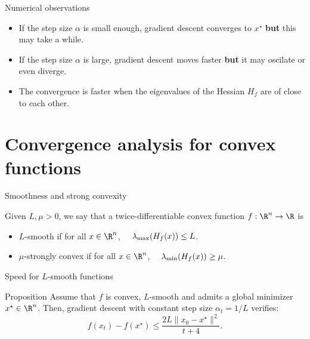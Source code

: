 \documentclass{beamer}
\begin{document}
\begin{frame}[t]{Numerical observations}
	\grid

	\begin{itemize}
		\item If the step size $\alpha$ is small enough, gradient descent converges to $x^{\star}$ \textbf{but} this may take a while.
			\vspace{0.4cm}
		\item If the step size $\alpha$ is large, gradient descent moves faster \textbf{but} it may oscilate or even diverge.
			\vspace{0.4cm}
		\item The convergence is faster when the eigenvalues of the Hessian $H_f$ are of close to each other.
	\end{itemize}

\end{frame}

\section{Convergence analysis for convex functions}

\begin{frame}[t]{Smoothness and strong convexity}
	\grid

	\vspace{-0.4cm}
	\begin{definition}
		Given $L,\mu > 0$, we say that a twice-differentiable convex function $f:\R^n \to \R$ is
		\begin{itemize}
			\item $L$-smooth if for all $x \in \R^n$, \ \ $\lambda_{\rm max}(H_f(x))\leq L$.
			\item $\mu$-strongly convex if for all $x \in \R^n$, \ \ $\lambda_{\rm min}(H_f(x))\geq \mu$.
		\end{itemize}
	\end{definition}
\end{frame}

\begin{frame}[t]{Speed for $L$-smooth functions}
	\grid

	\vspace{-0.4cm}
	\begin{block}{Proposition}
		Assume that $f$ is convex, $L$-smooth and admits a global minimizer $x^{\star} \in \R^n$.
		Then, gradient descent with constant step size $\alpha_t = 1/L$ verifies:
		$$
		f(x_t) - f(x^{\star}) \leq \frac{2 L \|x_0 - x^{\star}\|^2}{t+4}.
		$$
	\end{block}
\end{frame}
\end{document}
